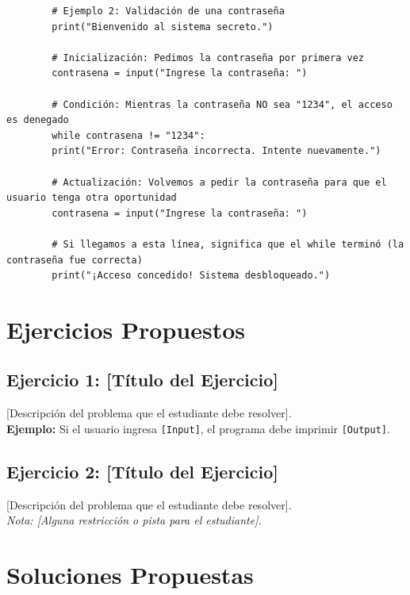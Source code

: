 \documentclass[11pt, a4paper]{article}
\begin{document}
	\begin{lstlisting}
		# Ejemplo 2: Validación de una contraseña
		print("Bienvenido al sistema secreto.")
		
		# Inicialización: Pedimos la contraseña por primera vez
		contrasena = input("Ingrese la contraseña: ")
		
		# Condición: Mientras la contraseña NO sea "1234", el acceso es denegado
		while contrasena != "1234":
		print("Error: Contraseña incorrecta. Intente nuevamente.")
		
		# Actualización: Volvemos a pedir la contraseña para que el usuario tenga otra oportunidad
		contrasena = input("Ingrese la contraseña: ") 
		
		# Si llegamos a esta línea, significa que el while terminó (la contraseña fue correcta)
		print("¡Acceso concedido! Sistema desbloqueado.")
	\end{lstlisting}
	
	\newpage
	
	\section{Ejercicios Propuestos}
	
	\subsection*{Ejercicio 1: [Título del Ejercicio]}
	[Descripción del problema que el estudiante debe resolver]. \\
	
	\textbf{Ejemplo:} Si el usuario ingresa \texttt{[Input]}, el programa debe imprimir \texttt{[Output]}.
	
	\vspace{0.5cm}
	
	\subsection*{Ejercicio 2: [Título del Ejercicio]}
	[Descripción del problema que el estudiante debe resolver]. \\
	
	\textit{Nota: [Alguna restricción o pista para el estudiante].}
	
	\newpage
	\section{Soluciones Propuestas}
	
\end{document}
